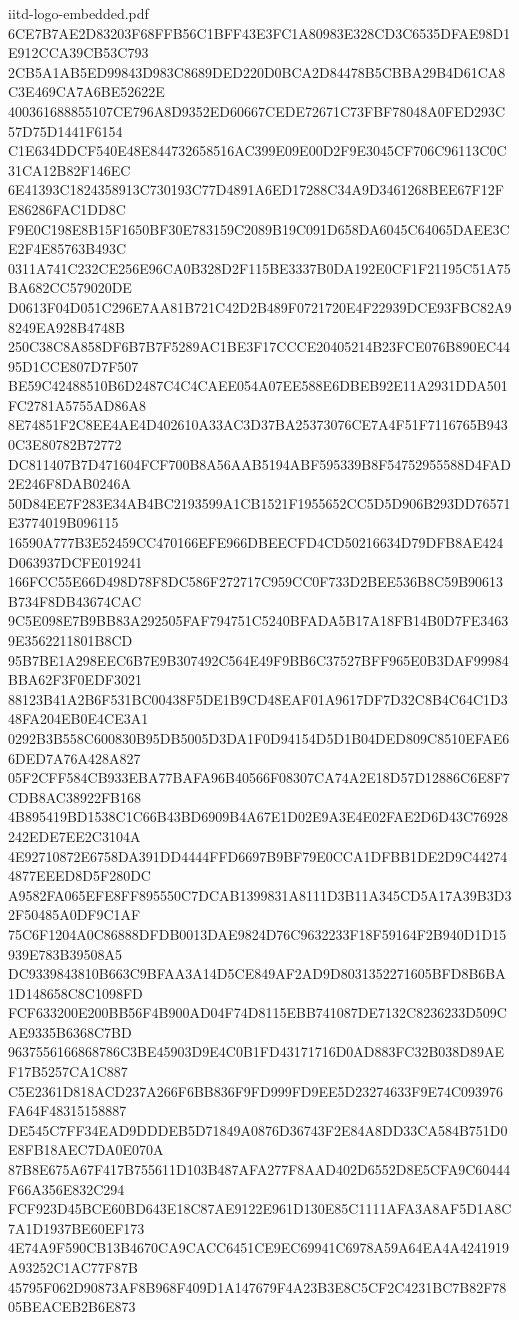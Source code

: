 \begin{filecontents*}[overwrite]{iitd-logo-embedded.pdf}
6CE7B7AE2D83203F68FFB56C1BFF43E3FC1A80983E328CD3C6535DFAE98D1E912CCA39CB53C793
2CB5A1AB5ED99843D983C8689DED220D0BCA2D84478B5CBBA29B4D61CA8C3E469CA7A6BE52622E
400361688855107CE796A8D9352ED60667CEDE72671C73FBF78048A0FED293C57D75D1441F6154
C1E634DDCF540E48E844732658516AC399E09E00D2F9E3045CF706C96113C0C31CA12B82F146EC
6E41393C1824358913C730193C77D4891A6ED17288C34A9D3461268BEE67F12FE86286FAC1DD8C
F9E0C198E8B15F1650BF30E783159C2089B19C091D658DA6045C64065DAEE3CE2F4E85763B493C
0311A741C232CE256E96CA0B328D2F115BE3337B0DA192E0CF1F21195C51A75BA682CC579020DE
D0613F04D051C296E7AA81B721C42D2B489F0721720E4F22939DCE93FBC82A98249EA928B4748B
250C38C8A858DF6B7B7F5289AC1BE3F17CCCE20405214B23FCE076B890EC4495D1CCE807D7F507
BE59C42488510B6D2487C4C4CAEE054A07EE588E6DBEB92E11A2931DDA501FC2781A5755AD86A8
8E74851F2C8EE4AE4D402610A33AC3D37BA25373076CE7A4F51F7116765B9430C3E80782B72772
DC811407B7D471604FCF700B8A56AAB5194ABF595339B8F54752955588D4FAD2E246F8DAB0246A
50D84EE7F283E34AB4BC2193599A1CB1521F1955652CC5D5D906B293DD76571E3774019B096115
16590A777B3E52459CC470166EFE966DBEECFD4CD50216634D79DFB8AE424D063937DCFE019241
166FCC55E66D498D78F8DC586F272717C959CC0F733D2BEE536B8C59B90613B734F8DB43674CAC
9C5E098E7B9BB83A292505FAF794751C5240BFADA5B17A18FB14B0D7FE34639E3562211801B8CD
95B7BE1A298EEC6B7E9B307492C564E49F9BB6C37527BFF965E0B3DAF99984BBA62F3F0EDF3021
88123B41A2B6F531BC00438F5DE1B9CD48EAF01A9617DF7D32C8B4C64C1D348FA204EB0E4CE3A1
0292B3B558C600830B95DB5005D3DA1F0D94154D5D1B04DED809C8510EFAE66DED7A76A428A827
05F2CFF584CB933EBA77BAFA96B40566F08307CA74A2E18D57D12886C6E8F7CDB8AC38922FB168
4B895419BD1538C1C66B43BD6909B4A67E1D02E9A3E4E02FAE2D6D43C76928242EDE7EE2C3104A
4E92710872E6758DA391DD4444FFD6697B9BF79E0CCA1DFBB1DE2D9C442744877EEED8D5F280DC
A9582FA065EFE8FF895550C7DCAB1399831A8111D3B11A345CD5A17A39B3D32F50485A0DF9C1AF
75C6F1204A0C86888DFDB0013DAE9824D76C9632233F18F59164F2B940D1D15939E783B39508A5
DC9339843810B663C9BFAA3A14D5CE849AF2AD9D8031352271605BFD8B6BA1D148658C8C1098FD
FCF633200E200BB56F4B900AD04F74D8115EBB741087DE7132C8236233D509CAE9335B6368C7BD
9637556166868786C3BE45903D9E4C0B1FD43171716D0AD883FC32B038D89AEF17B5257CA1C887
C5E2361D818ACD237A266F6BB836F9FD999FD9EE5D23274633F9E74C093976FA64F48315158887
DE545C7FF34EAD9DDDEB5D71849A0876D36743F2E84A8DD33CA584B751D0E8FB18AEC7DA0E070A
87B8E675A67F417B755611D103B487AFA277F8AAD402D6552D8E5CFA9C60444F66A356E832C294
FCF923D45BCE60BD643E18C87AE9122E961D130E85C1111AFA3A8AF5D1A8C7A1D1937BE60EF173
4E74A9F590CB13B4670CA9CACC6451CE9EC69941C6978A59A64EA4A4241919A93252C1AC77F87B
45795F062D90873AF8B968F409D1A147679F4A23B3E8C5CF2C4231BC7B82F7805BEACEB2B6E873

\end{filecontents*}
